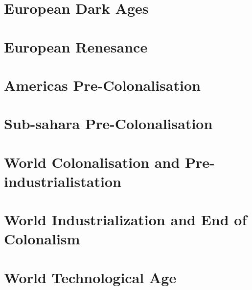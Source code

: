 \documentclass{article}
\begin{document}
\section{European Dark Ages}

\section{European Renesance}

\section{Americas Pre-Colonalisation}

\section{Sub-sahara Pre-Colonalisation}

\section{World Colonalisation and Pre-industrialistation}

\section{World Industrialization and End of Colonalism}

\section{World Technological Age}
\end{document}
